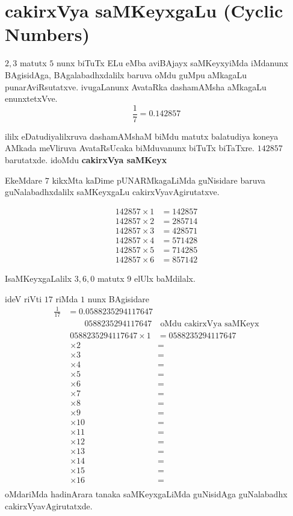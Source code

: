 \chapter{cakirxVya saMKeyxgaLu ({\rm Cyclic Numbers})}

$2,3$ matutx $5$ nunx biTuTx ELu eMba aviBAjayx saMKeyxyiMda iMdanunx BAgisidAga, BAgalabadhxdalilx baruva oMdu guMpu aMkagaLu punarAviRsutatxve. ivugaLanunx AvataRka dashamAMsha aMkagaLu enunxtetxVve.
$$
\frac{1}{7} = 0.142857
$$

ililx eDatudiyalilxruva dashamAMshaM biMdu matutx balatudiya koneya AMkada meVliruva AvataRsUcaka biMduvanunx biTuTx biTaTxre. $142857$ barutatxde. idoMdu {\bf cakirxVya saMKeyx}

EkeMdare $7$ kikxMta kaDime pUNARMkagaLiMda guNisidare baruva guNalabadhxdalilx saMKeyxgaLu cakirxVyavAgirutatxve.\\
\begin{minipage}[c]{4cm}
\begin{align*}
142857 \times 1 &= 142857\\
142857 \times 2 &= 285714\\
142857 \times 3 &= 428571\\
142857 \times 4 &= 571428\\
142857 \times 5 &= 714285\\
142857 \times 6 &= 857142
\end{align*}
\end{minipage}
IsaMKeyxgaLalilx $3,6,0$ matutx $9$ elUlx baMdilalx.

ideV riVti $17$ riMda $1$ nunx BAgisidare
\begin{align*}
\frac{1}{17} &= 0.0588235294117647\\
&\qquad 0588235294117647 \quad\text{oMdu cakirxVya saMKeyx}
\end{align*}
\begin{align*}
0588235294117647 \times 1 &= 0588235294117647\\
\times 2 &= &\\
\times 3 &= \\
\times 4 &= \\
\times 5 &= \\
\times 6 &= \\
\times 7 &= \\
\times 8 &= \\
\times 9 &= \\
\times 10 &= \\
\times 11 &= \\
\times  12&= \\
\times  13&= \\
\times  14&= \\
\times  15&= \\
\times  16&= \\
\end{align*}
oMdariMda hadinArara tanaka saMKeyxgaLiMda guNisidAga guNalabadhx cakirxVyavAgirutatxde.


